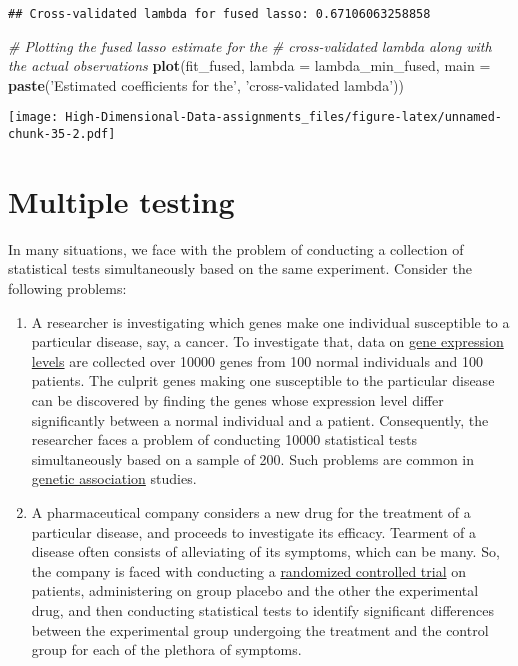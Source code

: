 \documentclass[
]{book}
\newenvironment{Shaded}{\begin{snugshade}}{\end{snugshade}}
\newcommand{\CommentTok}[1]{\textcolor[rgb]{0.56,0.35,0.01}{\textit{#1}}}
\newcommand{\DataTypeTok}[1]{\textcolor[rgb]{0.13,0.29,0.53}{#1}}
\newcommand{\KeywordTok}[1]{\textcolor[rgb]{0.13,0.29,0.53}{\textbf{#1}}}
\newcommand{\NormalTok}[1]{#1}
\newcommand{\StringTok}[1]{\textcolor[rgb]{0.31,0.60,0.02}{#1}}
\begin{document}
\begin{verbatim}
## Cross-validated lambda for fused lasso: 0.67106063258858
\end{verbatim}

\begin{Shaded}
\begin{Highlighting}[]
\CommentTok{# Plotting the fused lasso estimate for the}
\CommentTok{# cross-validated lambda along with the actual observations}
\KeywordTok{plot}\NormalTok{(fit_fused, }\DataTypeTok{lambda =}\NormalTok{ lambda_min_fused,}
     \DataTypeTok{main =} \KeywordTok{paste}\NormalTok{(}\StringTok{'Estimated coefficients for the'}\NormalTok{,}
                  \StringTok{'cross-validated lambda'}\NormalTok{))}
\end{Highlighting}
\end{Shaded}

\texttt{[image: High-Dimensional-Data-assignments\_files/figure-latex/unnamed-chunk-35-2.pdf]}

\hypertarget{multipletesting}{%
\chapter{Multiple testing}\label{multipletesting}}

In many situations, we face with the problem of conducting a collection of statistical tests simultaneously based on the same experiment. Consider the following problems:

\begin{enumerate}
\def\labelenumi{\arabic{enumi}.}
\item
  A researcher is investigating which genes make one individual susceptible to a particular disease, say, a cancer. To investigate that, data on \href{https://en.wikipedia.org/wiki/Gene_expression\#Measurement}{gene expression levels} are collected over 10000 genes from 100 normal individuals and 100 patients. The culprit genes making one susceptible to the particular disease can be discovered by finding the genes whose expression level differ significantly between a normal individual and a patient. Consequently, the researcher faces a problem of conducting 10000 statistical tests simultaneously based on a sample of 200. Such problems are common in \href{https://en.wikipedia.org/wiki/Genetic_association}{genetic association} studies.
\item
  A pharmaceutical company considers a new drug for the treatment of a particular disease, and proceeds to investigate its efficacy. Tearment of a disease often consists of alleviating of its symptoms, which can be many. So, the company is faced with conducting a \href{https://en.wikipedia.org/wiki/Randomized_controlled_trial}{randomized controlled trial} on patients, administering on group placebo and the other the experimental drug, and then conducting statistical tests to identify significant differences between the experimental group undergoing the treatment and the control group for each of the plethora of symptoms.
\end{enumerate}
\end{document}
